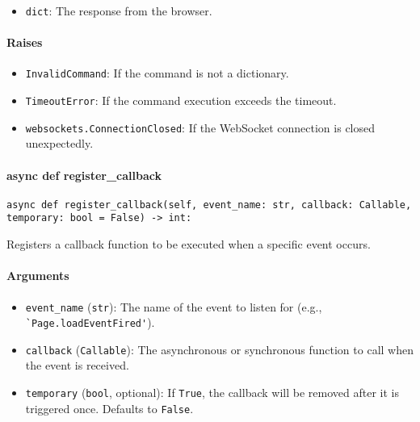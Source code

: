 \documentclass{article}
\begin{document}
\begin{itemize}
    \item \lstinline[style=pythonstyle]|dict|: The response from the browser.
\end{itemize}

\paragraph{Raises}

\begin{itemize}
    \item \lstinline[style=pythonstyle]|InvalidCommand|: If the command is not a dictionary.
    \item \lstinline[style=pythonstyle]|TimeoutError|: If the command execution exceeds the timeout.
    \item \lstinline[style=pythonstyle]|websockets.ConnectionClosed|: If the WebSocket connection is closed unexpectedly.
\end{itemize}

\paragraph{async def register\_callback}

\begin{lstlisting}[style=pythonstyle]
async def register_callback(self, event_name: str, callback: Callable, temporary: bool = False) -> int:
\end{lstlisting}

\noindent Registers a callback function to be executed when a specific event occurs.

\paragraph{Arguments}

\begin{itemize}
    \item \lstinline[style=pythonstyle]|event_name| (\lstinline[style=pythonstyle]|str|): The name of the event to listen for (e.g., \lstinline[style=pythonstyle]|`Page.loadEventFired'|).
    \item \lstinline[style=pythonstyle]|callback| (\lstinline[style=pythonstyle]|Callable|): The asynchronous or synchronous function to call when the event is received.
    \item \lstinline[style=pythonstyle]|temporary| (\lstinline[style=pythonstyle]|bool|, optional): If \lstinline[style=pythonstyle]|True|, the callback will be removed after it is triggered once. Defaults to \lstinline[style=pythonstyle]|False|.
\end{itemize}
\end{document}
